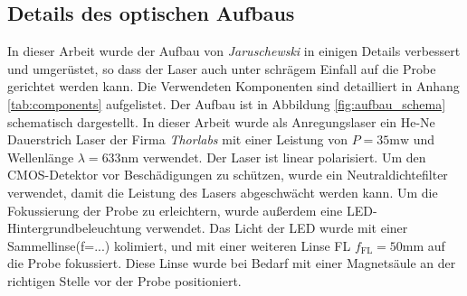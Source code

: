 \documentclass[titlepage]{article}
\begin{document}
\subsection{Details des optischen Aufbaus}
	In dieser Arbeit wurde der Aufbau von \textit{Jaruschewski} \cite{Jaruschewski.2020} in einigen Details verbessert und umgerüstet, so dass der Laser auch unter schrägem Einfall auf die Probe gerichtet werden kann. Die Verwendeten Komponenten sind detailliert in Anhang \ref{tab:components} aufgelistet. Der Aufbau ist in Abbildung \ref{fig:aufbau_schema} schematisch dargestellt. In dieser Arbeit wurde als Anregungslaser ein He-Ne Dauerstrich Laser der Firma \textit{Thorlabs} mit einer Leistung von $P = 35\mathrm{mw}$ und Wellenlänge $\lambda = 633\mathrm{nm}$ verwendet. Der Laser ist linear polarisiert. Um den CMOS-Detektor vor Beschädigungen zu schützen, wurde ein Neutraldichtefilter verwendet, damit die Leistung des Lasers abgeschwächt werden kann. Um die Fokussierung der Probe zu erleichtern, wurde außerdem eine LED-Hintergrundbeleuchtung verwendet. Das Licht der LED wurde mit einer Sammellinse(f=...) kolimiert, und mit einer weiteren Linse FL $f_{\mathrm{FL}}=50\mathrm{mm}$ auf die  Probe fokussiert. Diese Linse wurde bei Bedarf mit einer Magnetsäule an der richtigen Stelle vor der Probe positioniert.
\end{document}

